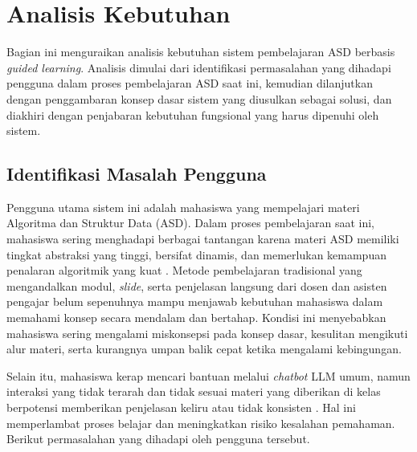 \section{Analisis Kebutuhan}

Bagian ini menguraikan analisis kebutuhan sistem pembelajaran ASD berbasis \textit{guided learning}. Analisis dimulai dari identifikasi permasalahan yang dihadapi pengguna dalam proses pembelajaran ASD saat ini, kemudian dilanjutkan dengan penggambaran konsep dasar sistem yang diusulkan sebagai solusi, dan diakhiri dengan penjabaran kebutuhan fungsional yang harus dipenuhi oleh sistem.

\subsection{Identifikasi Masalah Pengguna}

Pengguna utama sistem ini adalah mahasiswa yang mempelajari materi Algoritma dan Struktur Data (ASD). Dalam proses pembelajaran saat ini, mahasiswa sering menghadapi berbagai tantangan karena materi ASD memiliki tingkat abstraksi yang tinggi, bersifat dinamis, dan memerlukan kemampuan penalaran algoritmik yang kuat \autocite{Mtaho2024}. Metode pembelajaran tradisional yang mengandalkan modul, \textit{slide}, serta penjelasan langsung dari dosen dan asisten pengajar belum sepenuhnya mampu menjawab kebutuhan mahasiswa dalam memahami konsep secara mendalam dan bertahap. Kondisi ini menyebabkan mahasiswa sering mengalami miskonsepsi pada konsep dasar, kesulitan mengikuti alur materi, serta kurangnya umpan balik cepat ketika mengalami kebingungan.

Selain itu, mahasiswa kerap mencari bantuan melalui \textit{chatbot} LLM umum, namun interaksi yang tidak terarah dan tidak sesuai materi yang diberikan di kelas berpotensi memberikan penjelasan keliru atau tidak konsisten \autocite{White2023PromptPatternCatalog}. Hal ini memperlambat proses belajar dan meningkatkan risiko kesalahan pemahaman. Berikut permasalahan yang dihadapi oleh pengguna tersebut.

